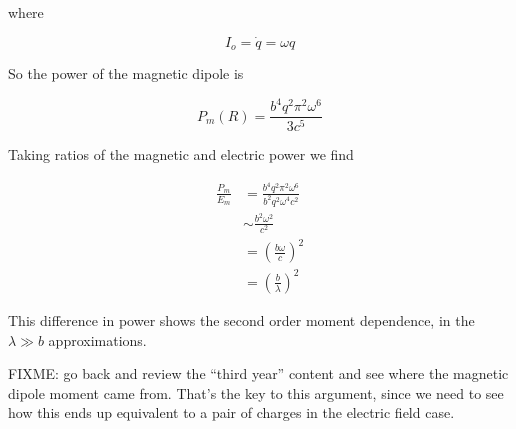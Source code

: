 where 

\begin{equation}\label{eqn:relativisticElectrodynamicsT8:310}
I_o = \dot{q} = \omega q
\end{equation}

So the power of the magnetic dipole is 

\begin{equation}\label{eqn:relativisticElectrodynamicsT8:330}
P_m(R) = \frac{b^4 q^2 \pi^2 \omega^6}{3 c^5}
\end{equation}

Taking ratios of the magnetic and electric power we find

\begin{align*}
\frac{P_m}{E_m} 
&= \frac{b^4 q^2 \pi^2 \omega^6}{b^2 q^2 \omega^4 c^2}  \\
&\sim \frac{b^2 \omega^2}{c^2} \\
&= \left(\frac{b \omega}{c}\right)^2 \\
&= \left(\frac{b }{\lambda}\right)^2 
\end{align*}

This difference in power shows the second order moment dependence, in the $\lambda \gg b$ approximations.

FIXME: go back and review the ``third year'' content and see where the magnetic dipole moment came from.  That's the key to this argument, since we need to see how this ends up equivalent to a pair of charges in the electric field case.

\EndNoBibArticle
